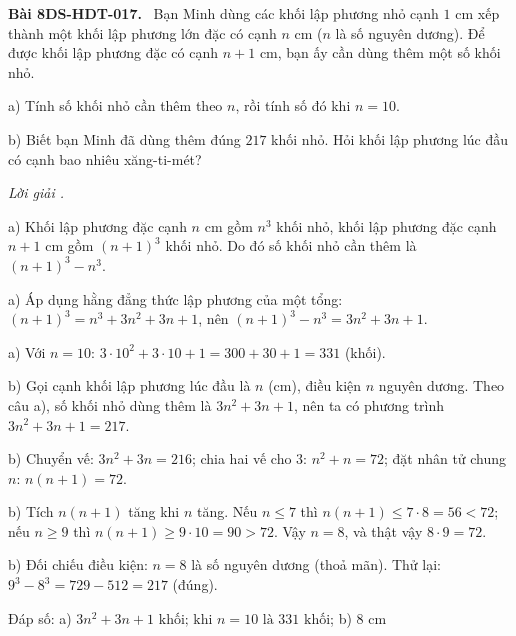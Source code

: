 \documentclass[12pt,a4paper]{article}
\newenvironment{problem}[1][]{\par\medskip\noindent\textbf{Bài #1.}\ }{\par}
\newenvironment{solution}[1][]{\par\noindent\textit{Lời giải #1.}\par}{\par}
\begin{document}
\begin{problem}[8DS-HDT-017]
Bạn Minh dùng các khối lập phương nhỏ cạnh $1$ cm xếp thành một khối lập phương lớn đặc có cạnh $n$ cm ($n$ là số nguyên dương). Để được khối lập phương đặc có cạnh $n + 1$ cm, bạn ấy cần dùng thêm một số khối nhỏ.

a) Tính số khối nhỏ cần thêm theo $n$, rồi tính số đó khi $n = 10$.

b) Biết bạn Minh đã dùng thêm đúng $217$ khối nhỏ. Hỏi khối lập phương lúc đầu có cạnh bao nhiêu xăng-ti-mét?

\begin{solution}
a) Khối lập phương đặc cạnh $n$ cm gồm $n^3$ khối nhỏ, khối lập phương đặc cạnh $n + 1$ cm gồm $(n + 1)^3$ khối nhỏ. Do đó số khối nhỏ cần thêm là $(n + 1)^3 - n^3$.

a) Áp dụng hằng đẳng thức lập phương của một tổng: $(n + 1)^3 = n^3 + 3n^2 + 3n + 1$, nên $(n + 1)^3 - n^3 = 3n^2 + 3n + 1$.

a) Với $n = 10$: $3 \cdot 10^2 + 3 \cdot 10 + 1 = 300 + 30 + 1 = 331$ (khối).

b) Gọi cạnh khối lập phương lúc đầu là $n$ (cm), điều kiện $n$ nguyên dương. Theo câu a), số khối nhỏ dùng thêm là $3n^2 + 3n + 1$, nên ta có phương trình $3n^2 + 3n + 1 = 217$.

b) Chuyển vế: $3n^2 + 3n = 216$; chia hai vế cho $3$: $n^2 + n = 72$; đặt nhân tử chung $n$: $n(n + 1) = 72$.

b) Tích $n(n + 1)$ tăng khi $n$ tăng. Nếu $n \leq 7$ thì $n(n + 1) \leq 7 \cdot 8 = 56 < 72$; nếu $n \geq 9$ thì $n(n + 1) \geq 9 \cdot 10 = 90 > 72$. Vậy $n = 8$, và thật vậy $8 \cdot 9 = 72$.

b) Đối chiếu điều kiện: $n = 8$ là số nguyên dương (thoả mãn). Thử lại: $9^3 - 8^3 = 729 - 512 = 217$ (đúng).

Đáp số: a) $\boxed{3n^2 + 3n + 1 \text{ khối; khi } n = 10 \text{ là } 331 \text{ khối}}$; b) $\boxed{8 \text{ cm}}$
\end{solution}
\end{problem}
\end{document}
